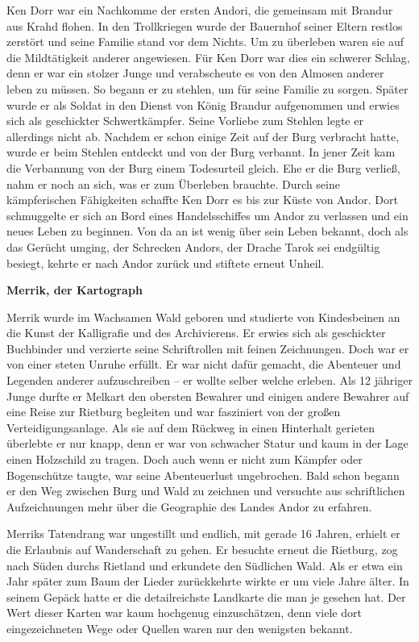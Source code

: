 \documentclass[10pt, a4paper, oneside]{book}
\begin{document}
\begin{multicols}{2}
Ken Dorr war ein Nachkomme der ersten Andori, die gemeinsam mit Brandur aus Krahd flohen. In den Trollkriegen wurde der Bauernhof seiner Eltern restlos zerstört und seine Familie stand vor dem Nichts. Um zu überleben waren sie auf die Mildtätigkeit anderer angewiesen. Für Ken Dorr war dies ein schwerer Schlag, denn er war ein stolzer Junge und verabscheute es von den Almosen anderer leben zu müssen. So begann er zu stehlen, um für seine Familie zu sorgen. Später wurde er als Soldat in den Dienst von König Brandur aufgenommen und erwies sich als geschickter Schwertkämpfer. Seine Vorliebe zum Stehlen legte er allerdings nicht ab.  Nachdem er schon einige Zeit auf der Burg verbracht hatte, wurde er beim Stehlen entdeckt und von der Burg verbannt. In jener Zeit kam die Verbannung von der Burg einem Todesurteil gleich. Ehe er die Burg verließ, nahm er noch an sich, was er zum Überleben brauchte. Durch seine kämpferischen Fähigkeiten schaffte Ken Dorr es bis zur Küste von Andor. Dort schmuggelte er sich an Bord eines Handelsschiffes um Andor zu verlassen und ein neues Leben zu beginnen. Von da an ist wenig über sein Leben bekannt, doch als das Gerücht umging, der Schrecken Andors, der Drache Tarok sei endgültig besiegt, kehrte er nach Andor zurück und stiftete erneut Unheil.\bigskip

 

\textbf{Merrik, der Kartograph}

Merrik wurde im Wachsamen Wald geboren und studierte von Kindesbeinen an die Kunst der Kalligrafie und des Archivierens. Er erwies sich als geschickter Buchbinder und verzierte seine Schriftrollen mit feinen Zeichnungen. Doch war er von einer steten Unruhe erfüllt. Er war nicht dafür gemacht, die Abenteuer und Legenden anderer aufzuschreiben – er wollte selber welche erleben. Als 12 jähriger Junge durfte er Melkart den obersten Bewahrer und einigen andere Bewahrer auf eine  Reise zur Rietburg begleiten und war fasziniert von der großen Verteidigungsanlage. Als sie auf dem Rückweg in einen Hinterhalt gerieten überlebte er nur knapp, denn er war von schwacher Statur und kaum in der Lage einen Holzschild zu tragen. Doch auch wenn er nicht zum Kämpfer oder Bogenschütze taugte, war seine Abenteuerlust ungebrochen. Bald schon begann er den Weg zwischen Burg und Wald zu zeichnen und versuchte aus schriftlichen Aufzeichnungen mehr über die Geographie des Landes Andor zu erfahren.\bigskip

Merriks Tatendrang war ungestillt und endlich, mit gerade 16 Jahren, erhielt er die Erlaubnis  auf Wanderschaft zu gehen. Er besuchte erneut die Rietburg, zog nach Süden durchs Rietland und erkundete den Südlichen Wald. Als er etwa ein Jahr später zum Baum der Lieder zurückkehrte wirkte er um viele Jahre älter. In seinem Gepäck hatte er die detailreichste Landkarte die man je gesehen hat. Der Wert dieser Karten war kaum hochgenug einzuschätzen, denn viele dort eingezeichneten Wege oder Quellen waren nur den wenigsten bekannt.\bigskip


\end{multicols}
\end{document}
